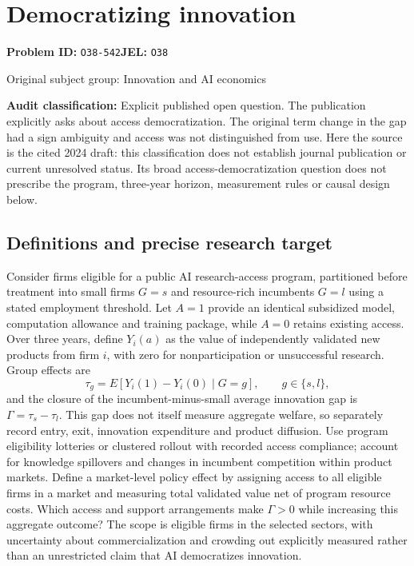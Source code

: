 \documentclass[11pt,a4paper]{article}
\begin{document}
\section*{Democratizing innovation}
\textbf{Problem ID:} \texttt{O38-542}\quad \textbf{JEL:} \texttt{O38}\par
\label{problem:OP-0412}
{\sffamily\small\color{muted}Original subject group: Innovation and AI economics\par}
\label{definitions:problem:30007694}
\textbf{Audit classification:} Explicit published open question. The publication explicitly asks about access democratization. The original term change in the gap had a sign ambiguity and access was not distinguished from use. Here the source is the cited 2024 draft: this classification does not establish journal publication or current unresolved status. Its broad access-democratization question does not prescribe the program, three-year horizon, measurement rules or causal design below.
\subsection*{Definitions and precise research target}
Consider firms eligible for a public AI research-access program, partitioned before treatment into small firms \(G=s\) and resource-rich incumbents \(G=l\) using a stated employment threshold. Let \(A=1\) provide an identical subsidized model, computation allowance and training package, while \(A=0\) retains existing access. Over three years, define \(Y_i(a)\) as the value of independently validated new products from firm \(i\), with zero for nonparticipation or unsuccessful research. Group effects are
\[
\tau_g=E[Y_i(1)-Y_i(0)\mid G=g],\qquad g\in\{s,l\},
\]
and the closure of the incumbent-minus-small average innovation gap is \(\Gamma=\tau_s-\tau_l\). This gap does not itself measure aggregate welfare, so separately record entry, exit, innovation expenditure and product diffusion. Use program eligibility lotteries or clustered rollout with recorded access compliance; account for knowledge spillovers and changes in incumbent competition within product markets. Define a market-level policy effect by assigning access to all eligible firms in a market and measuring total validated value net of program resource costs. Which access and support arrangements make \(\Gamma>0\) while increasing this aggregate outcome? The scope is eligible firms in the selected sectors, with uncertainty about commercialization and crowding out explicitly measured rather than an unrestricted claim that AI democratizes innovation.
\end{document}
